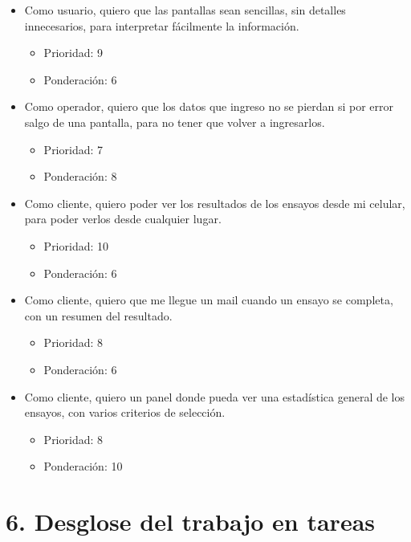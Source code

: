 \documentclass[11pt]{charter}
\begin{document}
\begin{itemize}

\item Como usuario, quiero que las pantallas sean sencillas, sin detalles innecesarios, para interpretar fácilmente la información.
	\begin{itemize}
	\item Prioridad: 9
	\item Ponderación: 6
	\end{itemize}

\item Como operador, quiero que los datos que ingreso no se pierdan si por error salgo de una pantalla, para no tener que volver a ingresarlos.
	\begin{itemize}
	\item Prioridad: 7
	\item Ponderación: 8
	\end{itemize}

\item Como cliente, quiero poder ver los resultados de los ensayos desde mi celular, para poder verlos desde cualquier lugar.
	\begin{itemize}
	\item Prioridad: 10
	\item Ponderación: 6
	\end{itemize}

\item Como cliente, quiero que me llegue un mail cuando un ensayo se completa, con un resumen del resultado.
	\begin{itemize}
	\item Prioridad: 8
	\item Ponderación: 6
	\end{itemize}

\item Como cliente, quiero un panel donde pueda ver una estadística general de los ensayos, con varios criterios de selección.
	\begin{itemize}
	\item Prioridad: 8
	\item Ponderación: 10
	\end{itemize}

\end{itemize}


\section{6. Desglose del trabajo en tareas}
\label{sec:wbs}
\end{document}
